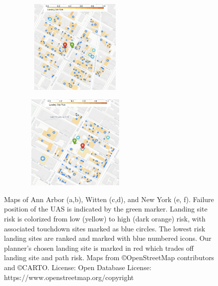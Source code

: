 \begin{figure}[!ht]
\begin{subfigure}[b]{0.47\linewidth}
        \caption{\label{fig:ch5_wt_map2}}
      \end{subfigure}
      \begin{subfigure}[b]{0.47\linewidth}
        \centering\includegraphics[clip, width=155pt, height=130pt]{chapter_5_mapping/imgs/newyork_scenario_1.png}
        \caption{\label{fig:ch5_ny_map1}}
      \end{subfigure}
      \begin{subfigure}[b]{0.47\linewidth}
        \centering\includegraphics[width=155pt, height=130pt]{chapter_5_mapping/imgs/newyork_scenario_4.png}
        \caption{\label{fig:ch5_ny_map2}}
      \end{subfigure}
         \caption[Maps of case studies for emergency landing]{Maps of Ann Arbor (a,b), Witten (c,d), and New York (e, f).  Failure position of the UAS is indicated by the green marker. Landing site risk is colorized from low (yellow) to high (dark orange) risk, with associated touchdown sites marked as blue circles. The lowest risk landing sites are ranked and marked with blue numbered icons. Our planner's chosen landing site is marked in red which trades off landing site and path risk. Maps from \copyright OpenStreetMap contributors and \copyright CARTO. License: Open Database License: https://www.openstreetmap.org/copyright}
     \label{fig:ch5_all_scenarios_map}
\end{figure}

